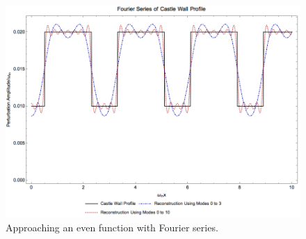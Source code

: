 \begin{figure}
    \centering
    \includegraphics[width=\textwidth]{chapters/assets/app/reconstruction-of-even-castle-wall-0point01-0point02-1-1point8.png}
    \caption{Approaching an even function with Fourier series.}
    \label{app-chap:convention-sec:fourier-series-eqn:parametric-resonance-castle-wall-fourier-coeff-even}
\end{figure}

